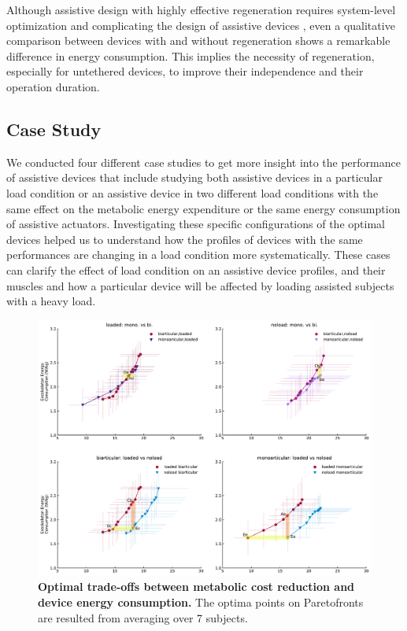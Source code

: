 \documentclass[10pt,letterpaper]{article}
\begin{document}
Although assistive design with highly effective regeneration requires system-level optimization and complicating the design of assistive devices \cite{140}, even a qualitative comparison between devices with and without regeneration shows a remarkable difference in energy consumption. This implies the necessity of regeneration, especially for untethered devices, to improve their independence and their operation duration.\\
\subsection*{Case Study}
We conducted four different case studies to get more insight into the performance of assistive devices that include studying both assistive devices in a particular load condition or an assistive device in two different load conditions with the same effect on the metabolic energy expenditure or the same energy consumption of assistive actuators. Investigating these specific configurations of the optimal devices helped us to understand how the profiles of devices with the same performances are changing in a load condition more systematically. These cases can clarify the effect of load condition on an assistive device profiles, and their muscles and how a particular device will be affected by loading assisted subjects with a heavy load.
\begin{figure}[!ht]   
	\centering
	\includegraphics[width=\linewidth]{Case_Studies/PaperFigure_Selected_Configurations.pdf}
	\vspace{1mm}
	\caption{{\small\textbf{Optimal trade-offs between metabolic cost reduction and device energy consumption.} The optima points on Paretofronts are resulted from averaging over 7 subjects.}}
	\label{Fig_Selected_OptimalDevices_On_Pareto}
\end{figure}
\end{document}
